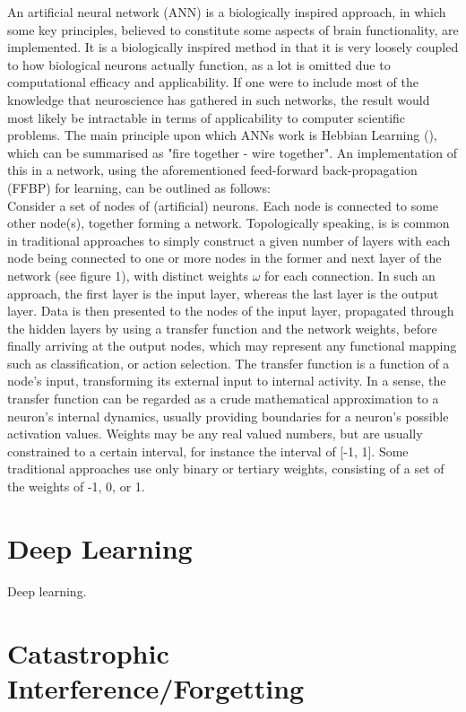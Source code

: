 An artificial neural network (ANN) is a biologically inspired approach, in which some key principles, believed to constitute some aspects of brain functionality, are implemented. It is a biologically inspired method in that it is very loosely coupled to how biological neurons actually function, as a lot is omitted due to computational efficacy and applicability. If one were to include most of the knowledge that neuroscience has gathered in such networks, the result would most likely be intractable in terms of applicability to computer scientific problems. The main principle upon which ANNs work is Hebbian Learning (\cite{Hebb1949}), which can be summarised as "fire together - wire together". An implementation of this in a network, using the aforementioned feed-forward back-propagation (FFBP) for learning, can be outlined as follows:
\\
Consider a set of nodes of (artificial) neurons. Each node is connected to some other node(s), together forming a network. Topologically speaking, is is common in traditional approaches to simply construct a given number of layers with each node being connected to one or more nodes in the former and next layer of the network (see figure 1), with distinct weights $\omega$ for each connection. In such an approach, the first layer is the input layer, whereas the last layer is the output layer. Data is then presented to the nodes of the input layer, propagated through the hidden layers by using a transfer function and the network weights, before finally arriving at the output nodes, which may represent any functional mapping such as classification, or action selection. The transfer function is a function of a node's input, transforming its external input to internal activity. In a sense, the transfer function can be regarded as a crude mathematical approximation to a neuron's internal dynamics, usually providing boundaries for a neuron's possible activation values. Weights may be any real valued numbers, but are usually constrained to a certain interval, for instance the interval of [-1, 1]. Some traditional approaches use only binary or tertiary weights, consisting of a set of the weights of -1, 0, or 1.

\section{Deep Learning}
Deep learning.

\section{Catastrophic Interference/Forgetting}

